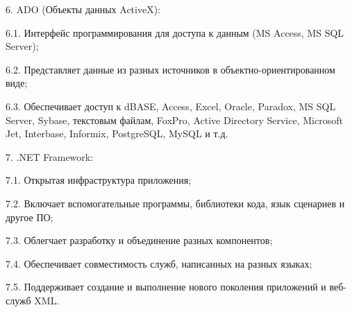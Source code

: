 \documentclass[14pt]{extarticle} %
\begin{document}
6.	ADO (Объекты данных ActiveX):

    6.1.	Интерфейс программирования для доступа к данным (MS Access, MS SQL Server);
    
    6.2.	Представляет данные из разных источников в объектно-ориентированном виде;
    
    6.3.	Обеспечивает доступ к dBASE, Access, Excel, Oracle, Paradox, MS SQL Server, Sybase, текстовым файлам, FoxPro, Active Directory Service, Microsoft Jet, Interbase, Informix, PostgreSQL, MySQL и т.д.
    
7.	.NET Framework:

    7.1.	Открытая инфраструктура приложения;
    
    7.2.	Включает вспомогательные программы, библиотеки кода, язык сценариев и другое ПО;
    
    7.3.	Облегчает разработку и объединение разных компонентов;
    
    7.4.	Обеспечивает совместимость служб, написанных на разных языках;
    
    7.5.	Поддерживает создание и выполнение нового поколения приложений и веб-служб XML.
\end{document}
